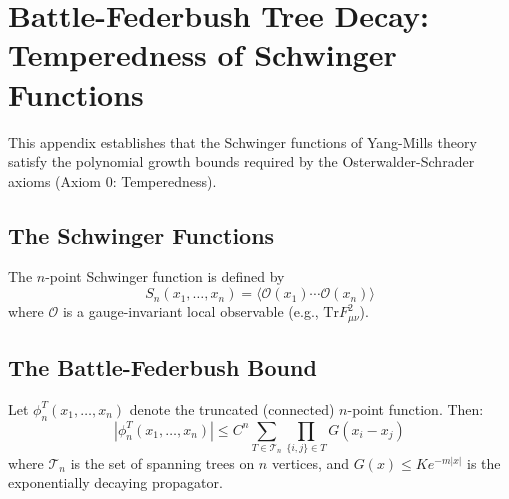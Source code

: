\chapter{Battle-Federbush Tree Decay: Temperedness of Schwinger Functions}
\label{app:battle_federbush}

This appendix establishes that the Schwinger functions of Yang-Mills theory satisfy the polynomial growth bounds required by the Osterwalder-Schrader axioms (Axiom 0: Temperedness).

\section{The Schwinger Functions}

\begin{definition}
The $n$-point Schwinger function is defined by
\begin{equation}
    S_n(x_1, \ldots, x_n) = \langle \mathcal{O}(x_1) \cdots \mathcal{O}(x_n) \rangle
\end{equation}
where $\mathcal{O}$ is a gauge-invariant local observable (e.g., $\text{Tr} F_{\mu\nu}^2$).
\end{definition}

\section{The Battle-Federbush Bound}

\begin{theorem}\label{thm:battle-federbush}
Let $\phi_n^T(x_1, \ldots, x_n)$ denote the truncated (connected) $n$-point function. Then:
\begin{equation}
    |\phi_n^T(x_1, \ldots, x_n)| \leq C^n \sum_{T \in \mathcal{T}_n} \prod_{\{i,j\} \in T} G(x_i - x_j)
\end{equation}
where $\mathcal{T}_n$ is the set of spanning trees on $n$ vertices, and $G(x) \leq K e^{-m|x|}$ is the exponentially decaying propagator.
\end{theorem}

